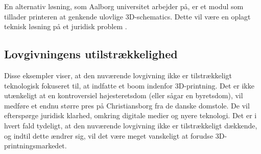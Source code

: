 En alternativ løsning, som Aalborg universitet arbejder på, er et modul som tillader printeren at genkende ulovlige 3D-schematics. Dette vil være en oplagt teknisk løsning på et juridisk problem \autocite{_dansk_????}.

\subsection{Lovgivningens utilstrækkelighed}
 
Disse eksempler viser, at den nuværende lovgivning ikke er tilstrækkeligt teknologisk fokuseret til, at indfatte et boom indenfor 3D-printning. Det er ikke utænkeligt at en kontroversiel højesteretsdom (eller sågar en byretsdom), vil medføre et endnu større pres på Christiansborg fra de danske domstole. De vil efterspørge juridisk klarhed, omkring digitale medier og nyere teknologi.
Det er i hvert fald tydeligt, at den nuværende lovgivning ikke er tilstrækkeligt dækkende, og indtil dette ændrer sig, vil det være meget vanskeligt at forudse 3D-printningsmarkedet.

